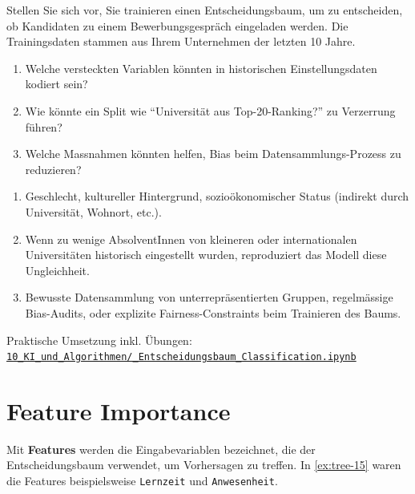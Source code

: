 \begin{mychallenge}
    Stellen Sie sich vor, Sie trainieren einen Entscheidungsbaum, um zu entscheiden, ob Kandidaten zu einem Bewerbungsgespräch eingeladen werden.
    Die Trainingsdaten stammen aus Ihrem Unternehmen der letzten 10 Jahre.
    \begin{enumerate}
        \item Welche versteckten Variablen könnten in historischen Einstellungsdaten kodiert sein?
        \item Wie könnte ein Split wie \enquote{Universität aus Top-20-Ranking?} zu Verzerrung führen?
        \item Welche Massnahmen könnten helfen, Bias beim Datensammlungs-Prozess zu reduzieren?
    \end{enumerate}
    \begin{myanswer}
        \begin{enumerate}
            \item Geschlecht, kultureller Hintergrund, sozioökonomischer Status (indirekt durch Universität, Wohnort, etc.).
            \item Wenn zu wenige AbsolventInnen von kleineren oder internationalen Universitäten historisch eingestellt wurden, reproduziert das Modell diese Ungleichheit.
            \item Bewusste Datensammlung von unterrepräsentierten Gruppen, regelmässige Bias-Audits, oder explizite Fairness-Constraints beim Trainieren des Baums.
        \end{enumerate}
    \end{myanswer}
\end{mychallenge}

\begin{myremark}[Notebook]
    Praktische Umsetzung inkl. Übungen:\newline
    \href{\notebookurl}{\texttt{10\_KI\_und\_Algorithmen/\_Entscheidungsbaum\_Classification.ipynb}}
\end{myremark}


\section{Feature Importance}
\begin{mydefinition}[Features]
    Mit \textbf{Features} werden die Eingabevariablen bezeichnet, die der Entscheidungsbaum verwendet, um Vorhersagen zu treffen. In \cref{ex:tree-15} waren die Features beispielsweise \texttt{Lernzeit} und \texttt{Anwesenheit}.
\end{mydefinition}

